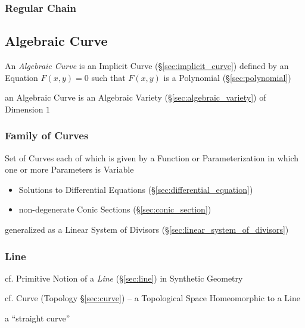 \subsubsection{Regular Chain}\label{sec:regular_chain}



\subsection{Algebraic Curve}\label{sec:algebraic_curve}

An \emph{Algebraic Curve} is an Implicit Curve (\S\ref{sec:implicit_curve})
defined by an Equation $F(x,y) = 0$ such that $F(x,y)$ is a Polynomial
(\S\ref{sec:polynomial})

an Algebraic Curve is an Algebraic Variety (\S\ref{sec:algebraic_variety}) of
Dimension $1$



\subsubsection{Family of Curves}\label{sec:curve_family}

Set of Curves each of which is given by a Function or Parameterization in which
one or more Parameters is Variable

\begin{itemize}
  \item Solutions to Differential Equations (\S\ref{sec:differential_equation})
  \item non-degenerate Conic Sections (\S\ref{sec:conic_section})
\end{itemize}

\fist generalized as a Linear System of Divisors
(\S\ref{sec:linear_system_of_divisors})



\subsubsection{Line}\label{sec:algebraic_line}

\fist cf. Primitive Notion of a \emph{Line} (\S\ref{sec:line}) in Synthetic
Geometry

\fist cf. Curve (Topology \S\ref{sec:curve}) -- a Topological Space Homeomorphic
to a Line

a ``straight curve''

